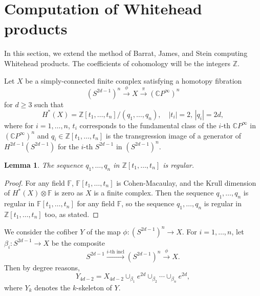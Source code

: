 \documentclass[a4paper]{amsart}
\numberwithin{equation}{section}
\newtheorem{lemma}[theorem]{Lemma}
\theoremstyle{definition}
\theoremstyle{remark}
\numberwithin{equation}{section}
\newcommand{\Z}{\mathbb{Z}}
\newcommand{\C}{\mathbb{C}}
\begin{document}
\section{Computation of Whitehead products}\label{Computation of Whitehead products}

In this section, we extend the method of Barrat, James, and Stein \cite{BJS} computing Whitehead products. The coefficients of cohomology will be the integers $\Z$.



Let $X$ be a simply-connected finite complex satisfying a homotopy fibration
\begin{equation}
  \label{fibration}
  (S^{2d-1})^n\xrightarrow{\phi}X\xrightarrow{\pi}(\C P^\infty)^n
\end{equation}
for $d\ge 3$ such that
\[
  H^*(X)=\Z[t_1,\ldots,t_n]/(q_1,\ldots,q_n),\quad|t_i|=2,\,|q_i|=2d,
\]
where for $i=1,\ldots,n$, $t_i$ corresponds to the fundamental class of the $i$-th $\C P^\infty$ in $(\C P^\infty)^n$ and $q_i\in\Z[t_1,\ldots,t_n]$ is the transgression image of a generator of $H^{2d-1}(S^{2d-1})$ for the $i$-th $S^{2d-1}$ in $(S^{2d-1})^n$.



\begin{lemma}
  \label{regular sequence}
  The sequence $q_1,\ldots,q_n$ in $\Z[t_1,\ldots,t_n]$ is regular.
\end{lemma}

\begin{proof}
  For any field $\mathbb{F}$, $\mathbb{F}[t_1,\ldots,t_n]$ is Cohen-Macaulay, and the Krull dimension of $H^*(X)\otimes\mathbb{F}$ is zero as $X$ is a finite complex. Then the sequence $q_1,\ldots,q_n$ is regular in $\mathbb{F}[t_1,\ldots,t_n]$ for any field $\mathbb{F}$, so the sequence $q_1,\ldots,q_n$ is regular in $\Z[t_1,\ldots,t_n]$ too, as stated.
\end{proof}



We consider the cofiber $Y$ of the map $\phi\colon(S^{2d-1})^n\to X$. For $i=1,\ldots,n$, let $\beta_i\colon S^{2d-1}\to X$ be the composite
\[
  S^{2d-1}\xrightarrow{i\text{-th incl}}(S^{2d-1})^n\xrightarrow{\phi}X.
\]
Then by degree reasons,
\begin{equation}
  \label{cell Y}
  Y_{4d-2}=X_{4d-2}\cup_{\beta_1}e^{2d}\cup_{\beta_2}\cdots\cup_{\beta_n}e^{2d},
\end{equation}
where $Y_k$ denotes the $k$-skeleton of $Y$.
\end{document}
